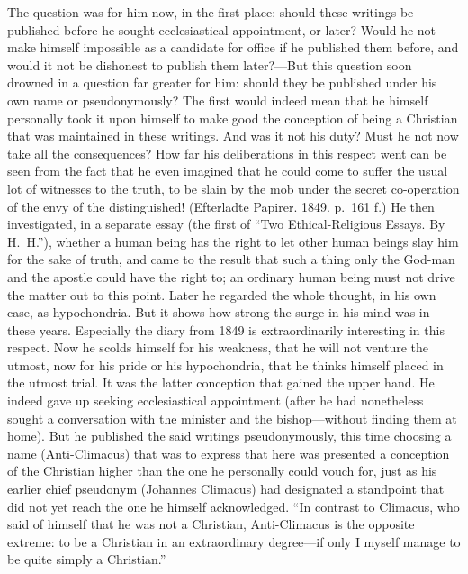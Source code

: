 \documentclass[12pt,a4paper]{book}
\newcommand{\opage}[1]{\marginnote{\footnotesize\textit{[#1]}}}
\begin{document}
The question was for him now, in the first place: should these writings
be published before he sought ecclesiastical appointment, or later?
Would he not make himself impossible as a candidate for office if he
published them before, and would it not be dishonest to publish them
later?---But this question soon drowned in a question far greater for
him: should they be published under his own name or pseudonymously? The
first would indeed mean that he himself personally took it upon himself
to make good the conception of being a Christian that was maintained in
these writings. And was it not his duty? Must he not now take
\opage{133}all the consequences? How far his deliberations in this respect
went can be seen from the fact that he even imagined that he could come
to suffer the usual lot of witnesses to the truth, to be slain by the
mob under the secret co-operation of the envy of the distinguished!
(Efterladte Papirer. 1849. p.~161 f.) He then investigated, in a
separate essay (the first of ``Two Ethical-Religious Essays. By
H.~H.''), whether a human being has the right to let other human beings
slay him for the sake of truth, and came to the result that such a
thing only the God-man and the apostle could have the right to; an
ordinary human being must not drive the matter out to this point. Later
he regarded the whole thought, in his own case, as hypochondria. But it
shows how strong the surge in his mind was in these years. Especially
the diary from 1849 is extraordinarily interesting in this respect. Now
he scolds himself for his weakness, that he will not venture the utmost,
now for his pride or his hypochondria, that he thinks himself placed in
the utmost trial. It was the latter conception that gained the upper
hand. He indeed gave up seeking ecclesiastical appointment (after he had
nonetheless sought a conversation with the minister and the
bishop---without finding them at home). But he published the said
writings pseudonymously, this time choosing a name (Anti-Climacus) that
was to express that here was presented a conception of the Christian
higher than the one he personally could vouch for, just as his earlier
chief pseudonym (Johannes Climacus) had designated a standpoint that did
not yet reach the one he himself acknowledged. ``In contrast to
Climacus, who said of himself that he was not a Christian, Anti-Climacus
is the opposite extreme: to be a Christian in an extraordinary
degree---if only I myself manage to be quite simply a Christian.''
\end{document}
